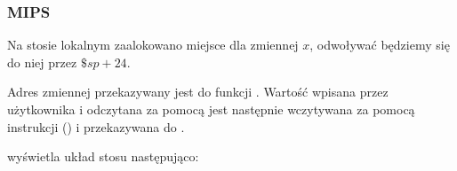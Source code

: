 \subsubsection{MIPS}

Na stosie lokalnym zaalokowano miejsce dla zmiennej $x$, odwoływać będziemy się do niej przez $\$sp+24$.

Adres zmiennej przekazywany jest do funkcji \scanf. Wartość wpisana przez użytkownika i odczytana za pomocą \scanf jest następnie wczytywana za pomocą instrukcji  () i przekazywana do \printf.



\IDA wyświetla układ stosu następująco:



